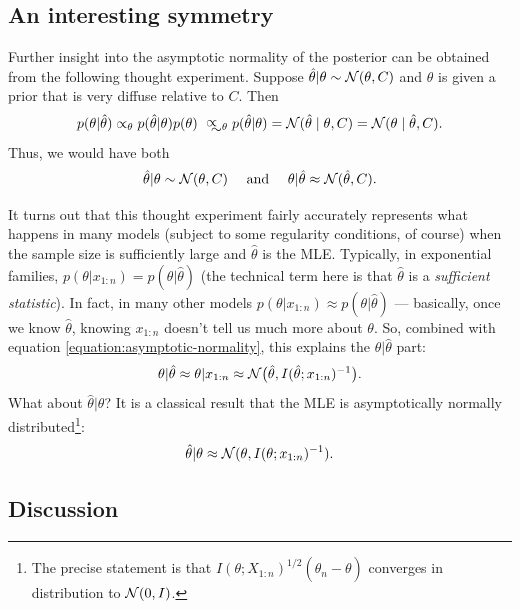 \documentclass[12pt]{article}
\begin{document}
\subsection{An interesting symmetry}

Further insight into the asymptotic normality of the posterior can be obtained from the following thought experiment.
Suppose $\hat \theta | \theta \sim \mathcal{N}(\theta,C)$ and $\theta$ is given a prior that is very diffuse relative to $C$. Then 
$$ p(\theta | \hat \theta) \propto_\theta p(\hat \theta | \theta) p(\theta)
\approxprop_{\! \! \theta} \; p(\hat \theta | \theta) = \N(\hat\theta \mid \theta,C) = \N(\theta \mid \hat \theta,C).$$
Thus, we would have both
$$ \hat\theta | \theta \sim \mathcal{N}(\theta,C)
\quad \text{ and } \quad \theta | \hat\theta \approx \mathcal{N}(\hat\theta,C). $$

It turns out that this thought experiment fairly accurately represents what happens in many models (subject to some regularity conditions, of course) when the sample size is sufficiently large and $\hat\theta$ is the MLE. Typically, in exponential families, $p(\theta | x_{1:n}) = p(\theta | \hat\theta)$ (the technical term here is that $\hat\theta$ is a \textit{sufficient statistic}). 
In fact, in many other models $p(\theta | x_{1:n}) \approx p(\theta | \hat\theta)$ --- basically, once we know $\hat\theta$, knowing $x_{1:n}$ doesn't tell us much more about $\theta$.  So, combined with equation \ref{equation:asymptotic-normality}, this explains the $\theta|\hat\theta$ part:
$$ \theta | \hat\theta \approx \theta | x_{1:n} \approx \mathcal{N} \big(\hat\theta, I(\hat\theta; x_{1:n})^{-1} \big). $$
What about $\hat\theta|\theta$?
It is a classical result that the MLE is asymptotically normally distributed\footnote{The precise statement is that $I(\theta; X_{1:n})^{1/2}(\hat\theta_n - \theta)$ converges in distribution to $\mathcal{N}(0,I)$.}:
$$ \hat\theta | \theta \approx \mathcal{N}(\theta,I(\theta; x_{1:n})^{-1}).$$



\subsection{Discussion}
\end{document}
